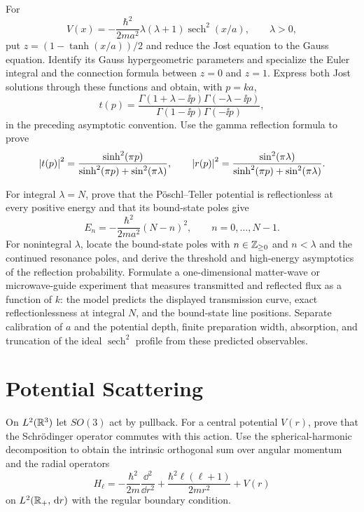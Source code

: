 \begin{exercise}
For
\[
 V(x)=-\frac{\hbar^2}{2ma^2}\lambda(\lambda+1)
 \operatorname{sech}^2(x/a),\qquad \lambda>0,
\]
put $z=(1-\tanh(x/a))/2$ and reduce the Jost equation to the Gauss equation.
Identify its Gauss hypergeometric parameters and specialize the Euler integral
and the connection formula between $z=0$ and $z=1$.
Express both Jost solutions through these functions and obtain, with $p=ka$,
\[
 t(p)=\frac{\Gamma(1+\lambda-\ii p)\Gamma(-\lambda-\ii p)}
 {\Gamma(1-\ii p)\Gamma(-\ii p)},
\]
in the preceding asymptotic convention.  Use the gamma
reflection formula to prove
\[
 \left\lvert t(p)\right\rvert^2=
 \frac{\sinh^2(\pi p)}{\sinh^2(\pi p)+\sin^2(\pi\lambda)},\qquad
 \left\lvert r(p)\right\rvert^2=
 \frac{\sin^2(\pi\lambda)}{\sinh^2(\pi p)+\sin^2(\pi\lambda)}.
\]
\end{exercise}

\begin{exercise}
For integral $\lambda=N$, prove that the P\"oschl--Teller potential is
reflectionless at every positive energy and that its bound-state poles give
\[
 E_n=-\frac{\hbar^2}{2ma^2}(N-n)^2,\qquad n=0,\ldots,N-1.
\]
For nonintegral $\lambda$, locate the bound-state poles with
$n\in\mathbb Z_{\ge0}$ and $n<\lambda$ and the continued resonance poles, and derive the threshold
and high-energy asymptotics of the reflection probability.  Formulate a
one-dimensional matter-wave or microwave-guide experiment that measures
transmitted and reflected flux as a function of $k$: the model predicts the
displayed transmission curve, exact reflectionlessness at integral $N$, and
the bound-state line positions.  Separate calibration of $a$ and the potential
depth, finite preparation width, absorption, and truncation of the ideal
$\operatorname{sech}^2$ profile from these predicted observables.
\end{exercise}

\section{Potential Scattering}

\begin{exercise}
On $L^2(\mathbb R^3)$ let $SO(3)$ act by pullback.  For a central potential $V(r)$,
prove that the Schr\"odinger operator commutes with this action.  Use the
spherical-harmonic decomposition to obtain
the intrinsic orthogonal sum over angular momentum and the radial operators
\[
 H_\ell=-\frac{\hbar^2}{2m}\frac{\dd^2}{\dd r^2}
 +\frac{\hbar^2\ell(\ell+1)}{2mr^2}+V(r)
\]
on $L^2(\mathbb R_+,\,\mathrm d r)$ with the regular boundary condition.
\end{exercise}

